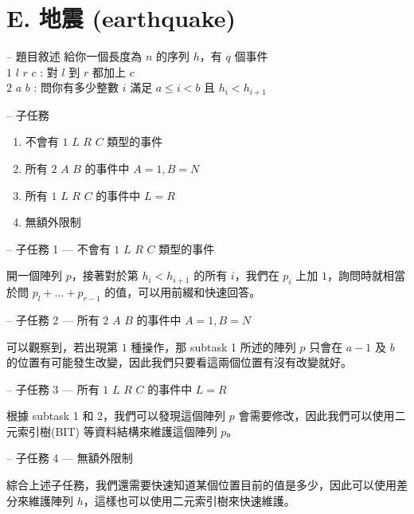 \documentclass[hyperref,UTF8,notheorems,xcolor={dvipsnames}]{beamer}
\newcommand{\btitle}[1]{{\secname} -- #1}
\theoremstyle{definition}
\begin{document}
\section{E. 地震 (earthquake)}

\begin{frame}[fragile]{\btitle{題目敘述}}
	給你一個長度為 $n$ 的序列 $h$，有 $q$ 個事件  \\
	$1$ $l$ $r$ $c$ : 對 $l$ 到 $r$ 都加上 $c$  \\
	$2$ $a$ $b$ : 問你有多少整數 $i$ 滿足 $a \le i < b$ 且 $h_i < h_{i + 1}$
\end{frame}

\begin{frame}[fragile]{\btitle{子任務}}
	\begin{enumerate}
		\item 不會有 $1$ $L$ $R$ $C$ 類型的事件
		\item 所有 $2$ $A$ $B$ 的事件中 $A = 1, B = N$
		\item 所有 $1$ $L$ $R$ $C$ 的事件中 $L = R$
		\item 無額外限制
	\end{enumerate}
\end{frame}

\begin{frame}[fragile]{\btitle{子任務 1 --- 不會有 $1$ $L$ $R$ $C$ 類型的事件}}
	
	開一個陣列 $p$，接著對於第 $h_i < h_{i + 1}$ 的所有 $i$，我們在 $p_i$ 上加 $1$，詢問時就相當於問 $p_l + ... + p_{r - 1}$ 的值，可以用前綴和快速回答。

\end{frame}

\begin{frame}[fragile]{\btitle{子任務 2 --- 所有 $2$ $A$ $B$ 的事件中 $A = 1, B = N$}}
	
	可以觀察到，若出現第 $1$ 種操作，那 subtask 1 所述的陣列 $p$ 只會在 $a - 1$ 及 $b$ 的位置有可能發生改變，因此我們只要看這兩個位置有沒有改變就好。

\end{frame}

\begin{frame}[fragile]{\btitle{子任務 3 --- 所有 $1$ $L$ $R$ $C$ 的事件中 $L = R$}}
	
	根據 subtask 1 和 2，我們可以發現這個陣列 $p$ 會需要修改，因此我們可以使用二元索引樹(BIT) 等資料結構來維護這個陣列 $p$。 

\end{frame}

\begin{frame}[fragile]{\btitle{子任務 4 --- 無額外限制}}
	
	綜合上述子任務，我們還需要快速知道某個位置目前的值是多少，因此可以使用差分來維護陣列 $h$，這樣也可以使用二元索引樹來快速維護。

\end{frame}
\end{document}
